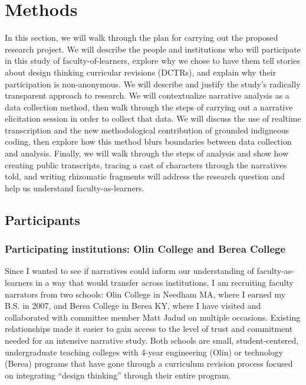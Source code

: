 \section{Methods}

In this section, we will walk through the plan for carrying out the proposed research project. We will describe the people and institutions who will participate in this study of faculty-of-learners, explore why we chose to have them tell stories about design thinking curricular revisions (DCTRs), and explain why their participation is non-anonymous. We will describe and justify the study's radically transparent approach to research. We will contextualize narrative analysis as a data collection method, then walk through the steps of carrying out a narrative elicitation session in order to collect that data. We will discuss the use of realtime transcription and the new methodological contribution of grounded indigneous coding, then explore how this method blurs boundaries between data collection and analysis. Finally, we will walk through the steps of analysis and show how creating public transcripts, tracing a cast of characters through the narratives told, and writing rhizomatic fragments will address the research question and help us understand faculty-as-learners.

\subsection{Participants}

\subsubsection{Participating institutions: Olin College and Berea College}

Since I wanted to see if narratives could inform our understanding of faculty-as-learners in a way that would transfer across institutions, I am recruiting faculty narrators from two schools: Olin College in Needham MA, where I earned my B.S. in 2007, and Berea College in Berea KY, where I have visited and collaborated with committee member Matt Jadud on multiple occasions. Existing relationships made it easier to gain access to the level of trust and commitment needed for an intensive narrative study. Both schools are small, student-centered, undergraduate teaching colleges with 4-year engineering (Olin) or technology (Berea) programs that have gone through a curriculum revision process focused on integrating “design thinking” through their entire program.

